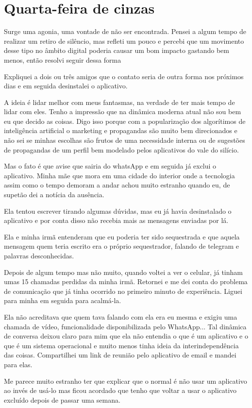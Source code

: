 \chapter{Quarta-feira de cinzas}\label{capitulo3}

Surge uma agonia, uma vontade de não ser encontrada. Pensei a algum tempo de realizar um retiro de silêncio, mas refleti um pouco e percebi que um movimento desse tipo no âmbito digital poderia causar um bom impacto gastando bem menos, então resolvi seguir dessa forma

Expliquei a dois ou três amigos que o contato seria de outra forma nos próximos dias e em seguida desinstalei o aplicativo.

A ideia é lidar melhor com meus fantasmas, na verdade de ter mais tempo de lidar com eles. Tenho a impressão que na dinâmica moderna atual não sou bem eu que decido as coisas. Digo isso porque com a popularização dos algorítimos de inteligência artificial o marketing e propagandas são muito bem direcionados e não sei se minhas escolhas são frutos de uma necessidade interna ou de sugestões de propagandas de um perfil bem modelado pelos aplicativos do vale do silício.

Mas o fato é que avise que sairia do whatsApp e em seguida já exclui o aplicativo. Minha mãe que mora em uma cidade do interior onde a tecnologia assim como o tempo demoram a andar achou muito estranho quando eu, de supetão dei a notícia da ausência.

Ela tentou escrever tirando algumas dúvidas, mas eu já havia desinstalado o aplicativo e por conta disso não recebia mais as mensagens enviadas por lá.

Ela e minha irmã entenderam que eu poderia ter sido sequestrada e que aquela mensagem quem teria escrito era o próprio sequestrador, falando de telegram e palavras desconhecidas.

Depois de algum tempo mas não muito, quando voltei a ver o celular, já tinham umas 15 chamadas perdidas da minha irmã. Retornei e me dei conta do problema de comunicação que já tinha ocorrido no primeiro minuto de experiência. Liguei para minha em seguida para acalmá-la. 

Ela não acreditava que quem tava falando com ela era eu mesma e exigiu uma chamada de vídeo, funcionalidade disponibilizada pelo WhatsApp... Tal dinâmica de conversa deixou claro para mim que ela não entendia o que é um aplicativo e o que é um sistema operacional e muito menos tinha ideia da interindependência das coisas. Compartilhei um link de reunião pelo aplicativo de email e mandei para elas.

Me parece muito estranho ter que explicar que o normal é não usar um aplicativo ao invés de usá-lo mas ficou acordado que tenho que voltar a usar o aplicativo excluído depois de passar uma semana. 